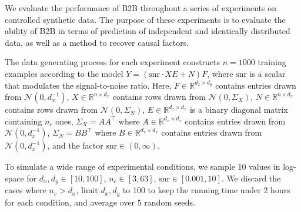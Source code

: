 We evaluate the performance of B2B throughout a series of experiments on
controlled synthetic data.
%
The purpose of these experiments is to evaluate the ability of B2B in terms of
prediction of independent and identically distributed data, as well as a method
to recover causal factors.

The data generating process for each experiment constructs $n=1000$ training examples
according to the model $Y = (\text{snr} \cdot XE + N)F$, where $\text{snr}$ is a
scalar that modulates the signal-to-noise ratio.
%
Here,
    $F \in \mathbb{R}^{d_x \times d_y}$ contains entries drawn from
$\mathcal{N}(0, d_x^{-1})$, $X \in \mathbb{R}^{n \times d_x}$ contains rows
drawn from $\mathcal{N}(0, \Sigma_X)$, $N \in \mathbb{R}^{n \times d_x}$
contains rows drawn from $\mathcal{N}(0, \Sigma_N)$, $E \in \mathbb{R}^{d_x
\times d_x}$ is a binary diagonal matrix containing $n_c$ ones, $\Sigma_X =
AA^\top$ where $A \in \mathbb{R}^{d_x \times d_x}$ contains entries drawn from
$\mathcal{N}(0, d_x^{-1})$, $\Sigma_N = BB^\top$ where $B \in \mathbb{R}^{d_x
\times d_x}$ contains entries drawn from $\mathcal{N}(0, d_x^{-1})$, and the
factor $\text{snr} \in (0, \infty)$.

To simulate a wide range of experimental conditions, we sample 10 values in log-space for $d_x, d_y \in \left[ 10, 100 \right]$, $n_c \in \left[ 3, 63 \right]$,
$\text{snr} \in \left[ 0.001, 10 \right]$. We discard the cases where $n_c > d_x$, limit $d_x, d_y$ to 100 to keep the running time under 2 hours for each condition, and average over 5 random seeds.
%

